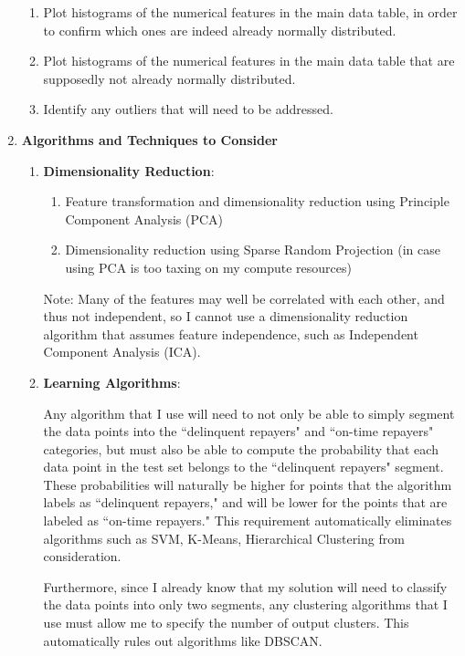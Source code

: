 \documentclass[12pt, letterpaper]{article}
\begin{document}
\begin{enumerate}
\begin{enumerate}
      \item Plot histograms of the numerical features in the main data table, in order to confirm which ones are indeed already normally distributed.
      \item Plot histograms of the numerical features in the main data table that are supposedly not already normally distributed.
      \item Identify any outliers that will need to be addressed.
    \end{enumerate}
  \item \textbf{Algorithms and Techniques to Consider}
    \begin{enumerate}
      \item \textbf{Dimensionality Reduction}:
        \begin{enumerate}
          \item Feature transformation and dimensionality reduction using Principle Component Analysis (PCA)
          \item Dimensionality reduction using Sparse Random Projection (in case using PCA is too taxing on my compute resources)
        \end{enumerate}
        Note: Many of the features may well be correlated with each other, and thus not independent, so I cannot use a dimensionality reduction algorithm that assumes feature independence, such as Independent Component Analysis (ICA).
      \item \textbf{Learning Algorithms}:

      Any algorithm that I use will need to not only be able to simply segment the data points into the ``delinquent repayers" and ``on-time repayers" categories, but must also be able to compute the probability that each data point in the test set belongs to the ``delinquent repayers" segment. These probabilities will naturally be higher for points that the algorithm labels as ``delinquent repayers," and will be lower for the points that are labeled as ``on-time repayers." This requirement automatically eliminates algorithms such as SVM, K-Means, Hierarchical Clustering from consideration.

      Furthermore, since I already know that my solution will need to classify the data points into only two segments, any clustering algorithms that I use must allow me to specify the number of output clusters. This automatically rules out algorithms like DBSCAN.


\end{enumerate}
\end{enumerate}
\end{document}
